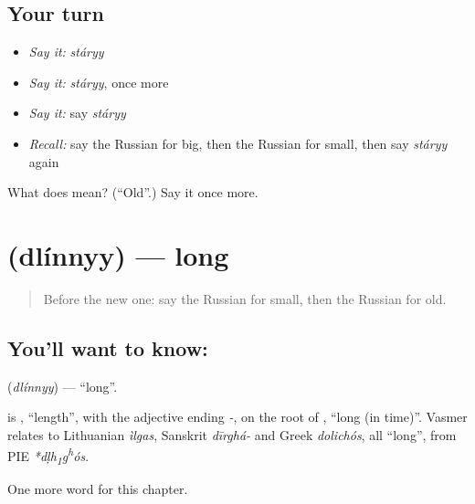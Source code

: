 \subsection*{Your turn}
\begin{itemize}
\raggedright
  \item \emph{Say it:} \emph{stáryy}
  \item \emph{Say it:} \emph{stáryy}, once more
  \item \emph{Say it:} say \emph{stáryy}
  \item \emph{Recall:} say the Russian for big, then the Russian for small, then say \emph{stáryy} again
\end{itemize}

\begin{tcolorbox}[breakable,colback=teal!4,colframe=teal!35!black,title={Before you move on}]
What does  mean? (\textquotedblleft{}Old\textquotedblright{}.) Say it once more.
\end{tcolorbox}
\section[\texorpdfstring{\ru{длинный} (dlínnyy)}{длинный (dlínnyy)}]{ (dlínnyy) — long}

\label{lesson:RU-C65-long}



\begin{quote}
Before the new one: say the Russian for small, then the Russian for old.
\end{quote}

\subsection*{You'll want to know: }
\textbf{} (\emph{dlínnyy}) — \textquotedblleft{}long\textquotedblright{}.

\begin{cousinweb}
\textbf{} is \emph{}, \textquotedblleft{}length\textquotedblright{}, with the adjective ending \emph{-}, on the root of \emph{}, \textquotedblleft{}long (in time)\textquotedblright{}. Vasmer relates \emph{} to Lithuanian \emph{ìlgas}, Sanskrit \emph{dīrghá-} and Greek \emph{dolichós}, all \textquotedblleft{}long\textquotedblright{}, from PIE \emph{*dḷh\textsubscript{1}g\textsuperscript{h}ós}.
\end{cousinweb}

\begin{grammarlens}[title={What you've built}]
One more word for this chapter.
\end{grammarlens}

